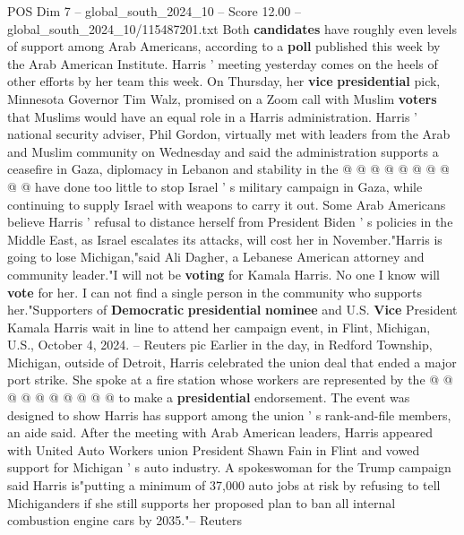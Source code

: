 \begin{textsample}{POS Dim 7 – global\_south\_2024\_10 – Score 12.00 – global\_south\_2024\_10/115487201.txt}
Both \textbf{candidates} have roughly even levels of support among Arab Americans, according to a \textbf{poll} published this week by the Arab American Institute.
Harris ' meeting yesterday comes on the heels of other efforts by her team this week.
On Thursday, her \textbf{vice} \textbf{presidential} pick, Minnesota Governor Tim Walz, promised on a Zoom call with Muslim \textbf{voters} that Muslims would have an equal role in a Harris administration.
Harris ' national security adviser, Phil Gordon, virtually met with leaders from the Arab and Muslim community on Wednesday and said the administration supports a ceasefire in Gaza, diplomacy in Lebanon and stability in the @ @ @ @ @ @ @ @ @ @ have done too little to stop Israel ' s military campaign in Gaza, while continuing to supply Israel with weapons to carry it out.
Some Arab Americans believe Harris ' refusal to distance herself from President Biden ' s policies in the Middle East, as Israel escalates its attacks, will cost her in November."Harris is going to lose Michigan,"said Ali Dagher, a Lebanese American attorney and community leader."I will not be \textbf{voting} for Kamala Harris.
No one I know will \textbf{vote} for her.
I can not find a single person in the community who supports her."Supporters of \textbf{Democratic} \textbf{presidential} \textbf{nominee} and U.S. \textbf{Vice} President Kamala Harris wait in line to attend her campaign event, in Flint, Michigan, U.S., October 4, 2024. -- Reuters pic Earlier in the day, in Redford Township, Michigan, outside of Detroit, Harris celebrated the union deal that ended a major port strike.
She spoke at a fire station whose workers are represented by the @ @ @ @ @ @ @ @ @ @ to make a \textbf{presidential} endorsement.
The event was designed to show Harris has support among the union ' s rank-and-file members, an aide said.
After the meeting with Arab American leaders, Harris appeared with United Auto Workers union President Shawn Fain in Flint and vowed support for Michigan ' s auto industry.
A spokeswoman for the Trump campaign said Harris is"putting a minimum of 37,000 auto jobs at risk by refusing to tell Michiganders if she still supports her proposed plan to ban all internal combustion engine cars by 2035."-- Reuters

\end{textsample}
